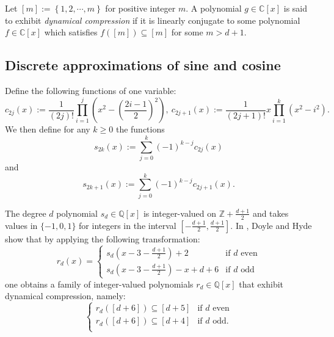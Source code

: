 \documentclass[12pt]{amsart}
\theoremstyle{definition}
\begin{document}
Let $[m] := \left\{1,2,\cdots, m\right\}$ for positive integer $m$. A polynomial $g\in \mathbb{C}[x]$ is said to exhibit \textit{dynamical compression} if it is linearly conjugate to some polynomial $f\in \mathbb{C}[x]$ which satisfies $f([m])\subseteq [m]$ for some $m>d+1$. 

\subsection{Discrete approximations of sine and cosine} Define the following functions of one variable:
$$ c_{2j}(x) := \frac{1}{(2j)!}\prod_{i=1}^{j} \left(x^2-\left(\frac{2i-1}{2}\right)^2\right),\ 
c_{2j+1}(x) := \frac{1}{(2j+1)!}x\prod_{i=1}^{k}(x^2-i^2).$$
We then define for any $k \geq 0$ the functions
$$ s_{2k}(x) := \sum_{j=0}^{k}(-1)^{k-j}c_{2j}(x)$$
and
$$
s_{2k+1}(x) := \sum_{j=0}^{k}(-1)^{k-j}c_{2j+1}(x).
$$

The degree $d$ polynomial $s_d\in \mathbb{Q}[x]$ is integer-valued on $\mathbb{Z}+\frac{d+1}{2}$ and takes values in $\{-1, 0, 1\}$ for integers in the interval $[-\frac{d+1}{2}, \frac{d+1}{2}].$ In \cite{doyle2022polynomialsrationalpreperiodicpoints}, Doyle and Hyde show that by applying the following transformation:
$$ r_d(x) = \begin{cases}
    s_d(x-3-\frac{d+1}{2})+2 & \text{if } d \text{ even} \\
    s_d(x-3-\frac{d+1}{2}) - x + d + 6 & \text{if } d \text{ odd}
\end{cases}
$$
one obtains a family of integer-valued polynomials $r_d\in\mathbb{Q}[x]$ that exhibit dynamical compression, namely:
$$ \begin{cases}
    r_d([d+6])\subseteq [d+5] & \text{if } d \text{ even} \\ 
    r_d([d+6])\subseteq [d+4] & \text{if } d \text{ odd}. \\ 
\end{cases}$$
\end{document}
